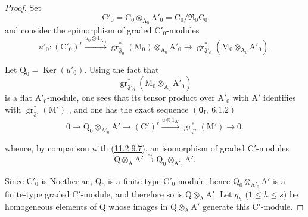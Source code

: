 \begin{proof}
Set
\[
  \mathrm{C}'_0=\mathrm{C}_0\otimes_{\mathrm{A}_0}\mathrm{A}'_0
  =\mathrm{C}_0/\mathfrak{R}_0\mathrm{C}_0
\]
and consider the epimorphism of graded $\mathrm{C}'_0$-modules
\[
  u'_0:(\mathrm{C}'_0)^r
  \xrightarrow{u_0\otimes 1_{\mathrm{A}'_0}}
  \operatorname{gr}^*_{\mathfrak{J}_0}(\mathrm{M}_0)\otimes_{\mathrm{A}_0}\mathrm{A}'_0
  \longrightarrow
  \operatorname{gr}^*_{\mathfrak{J}'_0}
  (\mathrm{M}_0\otimes_{\mathrm{A}_0}\mathrm{A}'_0).
\]

Let $\mathrm{Q}_0=\operatorname{Ker}(u'_0)$. Using the fact that
\[
  \operatorname{gr}^*_{\mathfrak{J}'_0}
  (\mathrm{M}_0\otimes_{\mathrm{A}_0}\mathrm{A}'_0)
\]
is a flat $\mathrm{A}'_0$-module, one sees that its tensor product over $\mathrm{A}'_0$ with $\mathrm{A}'$ identifies with $\operatorname{gr}^*_{\mathfrak{J}'}(\mathrm{M}')$ , and one has the exact sequence $(\mathbf{0}_\mathrm{I},~6.1.2)$
\begin{equation}
  0\longrightarrow\mathrm{Q}_0\otimes_{\mathrm{A}'_0}\mathrm{A}'
  \longrightarrow(\mathrm{C}')^r
  \xrightarrow{u\otimes 1_{\mathrm{A}'}}
  \operatorname{gr}^*_{\mathfrak{J}'}(\mathrm{M}')
  \longrightarrow 0.
  \label{IV.11.2.9.8}
\tag{11.2.9.8}
\end{equation}


whence, by comparison with {\hyperlink{ega4.c04.thm.11-2-9}{(11.2.9.7)}}, an isomorphism of graded $\mathrm{C}'$-modules
\[
  \mathrm{Q}\otimes_\mathrm{A}\mathrm{A}'
  \xrightarrow{\sim}
  \mathrm{Q}_0\otimes_{\mathrm{A}'_0}\mathrm{A}'.
\]

Since $\mathrm{C}'_0$ is Noetherian, $\mathrm{Q}_0$ is a finite-type $\mathrm{C}'_0$-module; hence $\mathrm{Q}_0\otimes_{\mathrm{A}'_0}\mathrm{A}'$ is a finite-type graded $\mathrm{C}'$-module, and therefore so is $\mathrm{Q}\otimes_\mathrm{A}\mathrm{A}'$. Let $q_h$ ($1\leqslant h\leqslant s$) be homogeneous elements of $\mathrm{Q}$ whose images in $\mathrm{Q}\otimes_\mathrm{A}\mathrm{A}'$ generate this $\mathrm{C}'$-module.


\end{proof}
